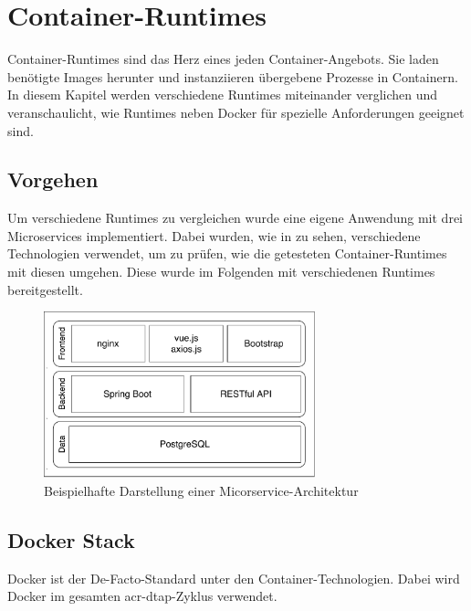 \chapter{Container-Runtimes}
\label{chap:compCtnrRuntimes}

Container-Runtimes sind das Herz eines jeden Container-Angebots. Sie laden benötigte Images herunter und instanziieren übergebene Prozesse in Containern. In diesem Kapitel werden verschiedene Runtimes miteinander verglichen und veranschaulicht, wie Runtimes neben Docker für spezielle Anforderungen geeignet sind.

\section{Vorgehen}
\label{sec:vorgehen}
Um verschiedene Runtimes zu vergleichen wurde eine eigene Anwendung mit drei Microservices implementiert. Dabei wurden, wie in  zu sehen, verschiedene Technologien verwendet, um zu prüfen, wie die getesteten Container-Runtimes mit diesen umgehen. Diese wurde im Folgenden mit verschiedenen Runtimes bereitgestellt.

\begin{figure}[h]
	\begin{center}
		\includegraphics[width=0.7\textwidth]{bilder/microservice-example-stack.pdf}
		\caption{Beispielhafte Darstellung einer Micorservice-Architektur}
		\label{fig:todosStack}
	\end{center}
\end{figure}

\section{Docker Stack}
\label{sec:compDocker}
Docker ist der De-Facto-Standard unter den Container-Technologien. Dabei wird Docker im gesamten \gls{acr-dtap}-Zyklus verwendet.

